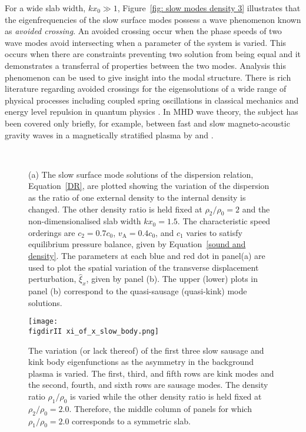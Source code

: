 For a wide slab width, $kx_0 \gg 1$, Figure~\ref{fig: slow modes density 3} illustrates that the eigenfrequencies of the slow surface modes possess a wave phenomenon known as \textit{avoided crossing}. An avoided crossing occur when the phase speeds of two wave modes avoid intersecting when a parameter of the system is varied. This occurs when there are constraints preventing two solution from being equal and it demonstrates a transferral of properties between the two modes. Analysis this phenomenon can be used to give insight into the modal structure. There is rich literature regarding avoided crossings for the eigensolutions of a wide range of physical processes including coupled spring oscillations in classical mechanics \citep{nov10} and energy level repulsion in quantum physics \citep{naq_etal72}. In MHD wave theory, the subject has been covered only briefly, for example, between fast and slow magneto-acoustic gravity waves in a magnetically stratified plasma by \cite{abd90} and \cite{mat_etal16}.

\begin{figure} []
	\centering
	 \\
	
	\caption{(a) The slow surface mode solutions of the dispersion relation, Equation~\eqref{DR}, are plotted showing the variation of the dispersion as the ratio of one external density to the internal density is changed. The other density ratio is held fixed at $\rho_2/\rho_0=2$ and the non-dimensionalised slab width $kx_0 = 1.5$. The characteristic speed orderings are $c_2=0.7c_0$, $v_\textrm{A}=0.4c_0$, and $c_1$ varies to satisfy equilibrium pressure balance, given by Equation~\eqref{sound and density}. The parameters at each blue and red dot in panel(a) are used to plot the spatial variation of the transverse displacement perturbation, $\widehat{\xi}_x$, given by panel (b). The upper (lower) plots in panel (b) correspond to the quasi-sausage (quasi-kink) mode solutions.}
	\label{fig: avoided crossing}
\end{figure}

\begin{figure}
	\centering
	\texttt{[image: \\figdirII xi\_of\_x\_slow\_body.png]}
	\caption{The variation (or lack thereof) of the first three slow sausage and kink body eigenfunctions as the asymmetry in the background plasma is varied. The first, third, and fifth rows are kink modes and the second, fourth, and sixth rows are sausage modes. The density ratio $\rho_1/\rho_0$ is varied while the other density ratio is held fixed at $\rho_2/\rho_0 = 2.0$. Therefore, the middle column of panels for which $\rho_1/\rho_0 = 2.0$ corresponds to a symmetric slab.}
	\label{fig: body eigenmodes}
\end{figure}

